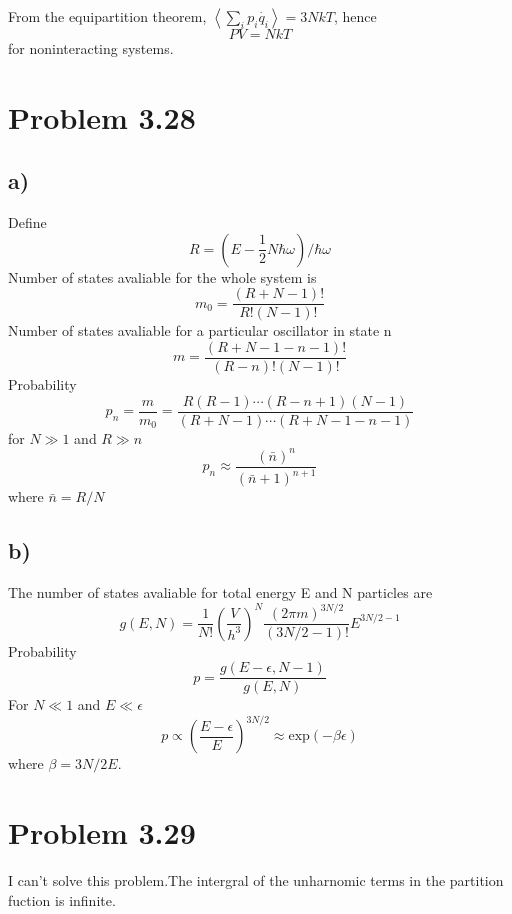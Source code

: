 \documentclass{article}
\begin{document}
	From the equipartition theorem, $\left<\sum_i p_i \dot{q_i} \right> = 3NkT  $, hence
	\begin{equation*}
		PV=NkT
	\end{equation*}
	for noninteracting systems.

\section*{Problem 3.28}
\subsection*{a)}
Define
\begin{equation*}
R=\left(E-\frac{1}{2}N\hbar\omega\right)\Bigg/\hbar\omega
\end{equation*}
Number of states avaliable for the whole system is
\begin{equation*}
m_0=\frac{(R+N-1)!}{R!(N-1)!}
\end{equation*}
Number of states avaliable for a particular oscillator in state n
\begin{equation*}
m=\frac{(R+N-1-n-1)!}{(R-n)!(N-1)!}
\end{equation*}
Probability
\begin{equation*}
p_n=\frac{m}{m_0}=\frac{R(R-1)\cdots(R-n+1)(N-1)}{(R+N-1)\cdots(R+N-1-n-1)}
\end{equation*}
for $N\gg 1$ and $R\gg n$
\begin{equation*}
p_n\approx \frac{(\bar n)^n}{(\bar n+1)^{n+1}}
\end{equation*}
where $\bar n=R/N$
\subsection*{b)}
The number of states avaliable for total energy E and N particles are
\begin{equation*}
g(E,N)=\frac{1}{N!}(\frac{V}{h^3})^N\frac{(2\pi m )^{3N/2}}{(3N/2-1)!}E^{3N/2-1}
\end{equation*}
Probability
\begin{equation*}
p=\frac{g(E-\epsilon,N-1)}{g(E,N)}
\end{equation*}
For $N\ll1$ and $E\ll\epsilon$
\begin{equation*}
p\propto\left(\frac{E-\epsilon}{E}\right)^{3N/2}\approx \mathrm{exp}(-\beta \epsilon)
\end{equation*}
where $\beta=3N/2E$.

\section*{Problem 3.29}
	I can't solve this problem.The intergral of the unharnomic terms in the partition fuction is infinite.
	
\end{document}
